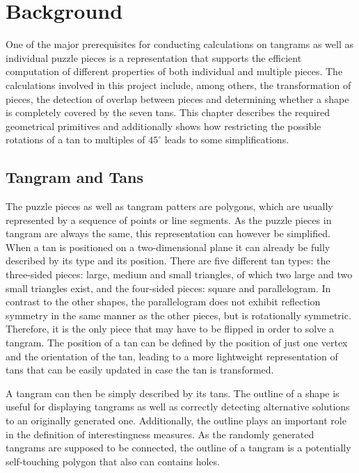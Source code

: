 \chapter{Background}\label{chapter:background}

One of the major prerequisites for conducting calculations on tangrams as well as individual puzzle pieces is a representation that supports the efficient computation of different properties of both individual and multiple pieces. The calculations involved in this project include, among others, the transformation of pieces, the detection of overlap between pieces and determining whether a shape is completely covered by the seven tans. This chapter describes the required geometrical primitives and additionally shows how restricting the possible rotations of a tan to multiples of $45^{\circ}$ leads to some simplifications.

\section{Tangram and Tans}

The puzzle pieces as well as tangram patters are polygons, which are usually represented by a sequence of points or line segments. As the puzzle pieces in tangram are always the same, this representation can however be simplified. When a tan is positioned on a two-dimensional plane it can already be fully described by its type and its position. There are five different tan types: the three-sided pieces: large, medium and small triangles, of which two large and two small triangles exist, and the four-sided pieces: square and parallelogram. In contrast to the other shapes, the parallelogram does not exhibit reflection symmetry in the same manner as the other pieces, but is rotationally symmetric. Therefore, it is the only piece that may have to be flipped in order to solve a tangram. The position of a tan can be defined by the position of just one vertex and the orientation of the tan, leading to a more lightweight representation of tans that can be easily updated in case the tan is transformed. 

A tangram can then be simply described by its tans. The outline of a shape is useful for displaying tangrams as well as correctly detecting alternative solutions to an originally generated one. Additionally, the outline plays an important role in the definition of interestingness measures. As the randomly generated tangrams are supposed to be connected, the outline of a tangram is a potentially self-touching polygon that also can contains holes.

